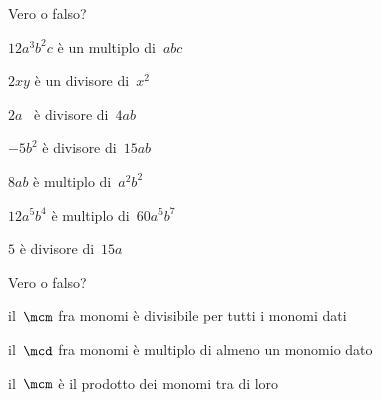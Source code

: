 \begin{esercizio}
\label{ese:9.43}
Vero o falso?

\TabPositions{10cm}
\begin{enumeratea}
\spazielenx
\item \(12a^{3}b^{2}c\) è un multiplo di~\(abc\) \hfill\verofalso
\item \(2xy\) è un divisore di~\(x^{2}\) \hfill\verofalso
\item \(2a\) \ è divisore di~\(4ab\) \hfill\verofalso
\item \(-5b^{2}\) è divisore di~\(15ab\) \hfill\verofalso
\item \(8ab\) è multiplo di~\(a^{2}b^{2}\) \hfill\verofalso
\item \(12a^{5}b^{4}\) è multiplo di~\(60a^{5}b^{7}\) \hfill\verofalso
\item \(5\) è divisore di~\(15a\) \hfill\verofalso
\end{enumeratea}
\end{esercizio}

\begin{esercizio}
\label{ese:9.44}
Vero o falso?

\TabPositions{10cm}
\begin{enumeratea}
\spazielenx
\item il~\(\mcm\) fra monomi è divisibile per tutti i monomi dati 
\hfill\verofalso
\item il~\(\mcd\) fra monomi è multiplo di almeno un monomio dato 
\hfill\verofalso
\item il~\(\mcm\) è il prodotto dei monomi tra di loro \hfill\verofalso
\end{enumeratea}
\end{esercizio}


